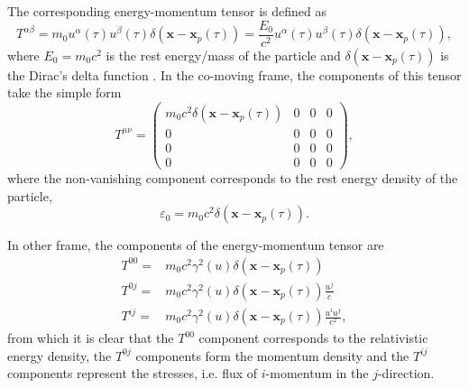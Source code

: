 The corresponding energy-momentum tensor is defined as
\begin{equation}
T^{\alpha\beta}=m_0 u^{\alpha}\left(\tau\right)u^{\beta}\left(\tau\right)\delta\left(\textbf{x} - \textbf{x}_{p}\left(\tau\right)\right)=\frac{E_0}{c^{2}}u^{\alpha}\left(\tau\right)u^{\beta}\left(\tau\right)\delta\left(\textbf{x} - \textbf{x}_{p}\left(\tau\right)\right),
\end{equation}
where $E_0 =m_0 c^2$ is the rest energy/mass of the particle and $\delta\left(\textbf{x} - \textbf{x}_{p}\left(\tau\right)\right)$ is the Dirac's delta function . In the co-moving frame, the components of this tensor take the simple form
\begin{equation}
T^{\mu\nu}=\left(\begin{array}{cccc}
m_0 c^2 \delta\left(\textbf{x} - \textbf{x}_{p}\left(\tau\right)\right) & 0 & 0 & 0\\
0 & 0 & 0 & 0\\
0 & 0 & 0 & 0\\
0 & 0 & 0 & 0
\end{array}\right),
\end{equation}
where the non-vanishing component corresponds to the rest energy density of the particle,
\begin{equation}
\varepsilon_0 = m_0 c^2 \delta\left(\textbf{x} -\textbf{x}_{p}\left(\tau\right)\right).
\end{equation}

In other frame, the components of the energy-momentum tensor are
\begin{subequations}
\begin{align}
T^{00} = &m_0 c^2 \gamma^2 (u) \delta\left(\textbf{x}-\textbf{x}_{p}\left(\tau\right)\right)  \\
T^{0j} = &m_0 c^2 \gamma^2 (u) \delta\left(\textbf{x}-\textbf{x}_{p}\left(\tau\right)\right)\frac{u^j}{c} \\
T^{ij} = &m_0 c^2 \gamma^2 (u) \delta\left(\textbf{x}-\textbf{x}_{p}\left(\tau\right)\right)\frac{u^i u^j}{c^2},
\end{align}
\end{subequations}
from which it is clear that the $T^{00}$ component corresponds to the relativistic energy density, the $T^{0j}$ components form the momentum density and the $T^{ij}$ components represent the stresses, i.e. flux of $i$-momentum in the $j$-direction.

